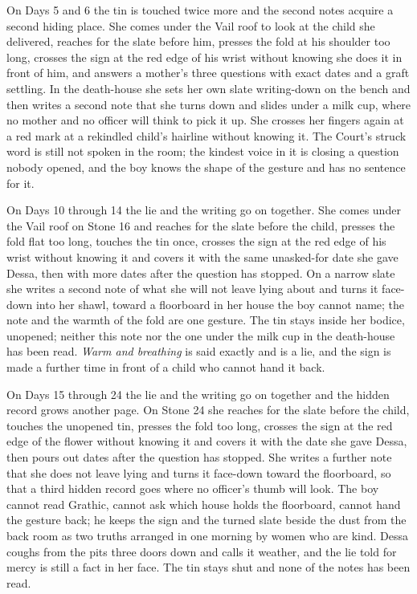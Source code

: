 \documentclass{design/chronicle}
\begin{document}
{On Days 5 and 6 the tin is touched twice more and the second notes acquire a second hiding place. She comes under the Vail roof to look at the child she delivered, reaches for the slate before him, presses the fold at his shoulder too long, crosses the sign at the red edge of his wrist without knowing she does it in front of him, and answers a mother’s three questions with exact dates and a graft settling. In the death-house she sets her own slate writing-down on the bench and then writes a second note that she turns down and slides under a milk cup, where no mother and no officer will think to pick it up. She crosses her fingers again at a red mark at a rekindled child’s hairline without knowing it. The Court’s struck word is still not spoken in the room; the kindest voice in it is closing a question nobody opened, and the boy knows the shape of the gesture and has no sentence for it.

On Days 10 through 14 the lie and the writing go on together. She comes under the Vail roof on Stone 16 and reaches for the slate before the child, presses the fold flat too long, touches the tin once, crosses the sign at the red edge of his wrist without knowing it and covers it with the same unasked-for date she gave Dessa, then with more dates after the question has stopped. On a narrow slate she writes a second note of what she will not leave lying about and turns it face-down into her shawl, toward a floorboard in her house the boy cannot name; the note and the warmth of the fold are one gesture. The tin stays inside her bodice, unopened; neither this note nor the one under the milk cup in the death-house has been read. \emph{Warm and breathing} is said exactly and is a lie, and the sign is made a further time in front of a child who cannot hand it back.

On Days 15 through 24 the lie and the writing go on together and the hidden record grows another page. On Stone 24 she reaches for the slate before the child, touches the unopened tin, presses the fold too long, crosses the sign at the red edge of the flower without knowing it and covers it with the date she gave Dessa, then pours out dates after the question has stopped. She writes a further note that she does not leave lying and turns it face-down toward the floorboard, so that a third hidden record goes where no officer’s thumb will look. The boy cannot read Grathic, cannot ask which house holds the floorboard, cannot hand the gesture back; he keeps the sign and the turned slate beside the dust from the back room as two truths arranged in one morning by women who are kind. Dessa coughs from the pits three doors down and calls it weather, and the lie told for mercy is still a fact in her face. The tin stays shut and none of the notes has been read.

}
\end{document}
